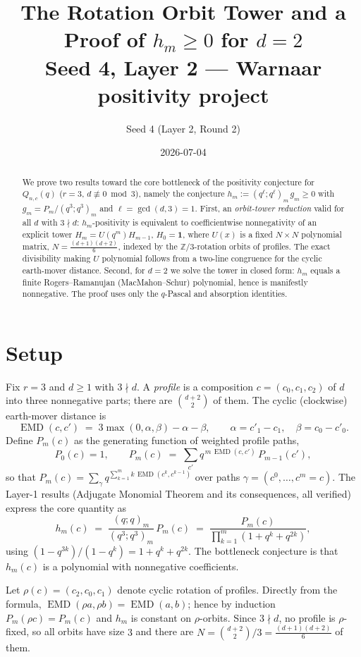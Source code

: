 \documentclass[11pt]{article}
\title{The Rotation Orbit Tower and a Proof of $h_m\ge 0$ for $d=2$\\
\large Seed 4, Layer 2 --- Warnaar positivity project}
\author{Seed 4 (Layer 2, Round 2)}
\date{2026-07-04}
\theoremstyle{remark}
\newcommand{\emd}{\operatorname{EMD}}
\begin{document}
\maketitle

\begin{abstract}
We prove two results toward the core bottleneck of the positivity
conjecture for $Q_{n,c}(q)$ ($r=3$, $d\not\equiv 0 \bmod 3$), namely the
conjecture $h_m := (q^{\ell};q^{\ell})_m\, g_m \ge 0$ with
$g_m = P_m/(q^3;q^3)_m$ and $\ell=\gcd(d,3)=1$.
First, an \emph{orbit-tower reduction} valid for all $d$ with $3\nmid d$:
$h_m$-positivity is equivalent to coefficientwise nonnegativity of an
explicit tower $H_m = U(q^m)H_{m-1}$, $H_0=\mathbf 1$, where $U(x)$ is a
fixed $N\times N$ polynomial matrix, $N=\tfrac{(d+1)(d+2)}{6}$, indexed by
the $\mathbb Z/3$-rotation orbits of profiles. The exact divisibility making
$U$ polynomial follows from a two-line congruence for the cyclic earth-mover
distance. Second, for $d=2$ we solve the tower in closed form: $h_m$ equals
a finite Rogers--Ramanujan (MacMahon--Schur) polynomial, hence is manifestly
nonnegative. The proof uses only the $q$-Pascal and absorption identities.
\end{abstract}

\section{Setup}

Fix $r=3$ and $d\ge 1$ with $3\nmid d$. A \emph{profile} is a composition
$c=(c_0,c_1,c_2)$ of $d$ into three nonnegative parts; there are
$\binom{d+2}{2}$ of them. The cyclic (clockwise) earth-mover distance is
\[
\emd(c,c') \;=\; 3\max(0,\alpha,\beta)-\alpha-\beta,
\qquad \alpha = c'_1-c_1,\quad \beta = c_0-c'_0 .
\]
Define $P_m(c)$ as the generating function of weighted profile paths,
\[
P_0(c)=1,\qquad
P_m(c)\;=\;\sum_{c'} q^{\,m\,\emd(c,c')}\,P_{m-1}(c'),
\]
so that $P_m(c)=\sum_{\gamma} q^{\sum_{k=1}^m k\,\emd(c^{k},c^{k-1})}$ over
paths $\gamma=(c^0,\dots,c^m=c)$. The Layer-1 results (Adjugate Monomial
Theorem and its consequences, all verified) express the core quantity as
\[
h_m(c)\;=\;\frac{(q;q)_m}{(q^3;q^3)_m}\,P_m(c)
\;=\;\frac{P_m(c)}{\prod_{k=1}^m (1+q^k+q^{2k})},
\]
using $(1-q^{3k})/(1-q^k)=1+q^k+q^{2k}$. The bottleneck conjecture is that
$h_m(c)$ is a polynomial with nonnegative coefficients.

Let $\rho(c)=(c_2,c_0,c_1)$ denote cyclic rotation of profiles. Directly
from the formula, $\emd(\rho a,\rho b)=\emd(a,b)$; hence by induction
$P_m(\rho c)=P_m(c)$ and $h_m$ is constant on $\rho$-orbits. Since
$3\nmid d$, no profile is $\rho$-fixed, so all orbits have size $3$ and
there are $N=\binom{d+2}{2}/3=\frac{(d+1)(d+2)}{6}$ of them.
\end{document}
